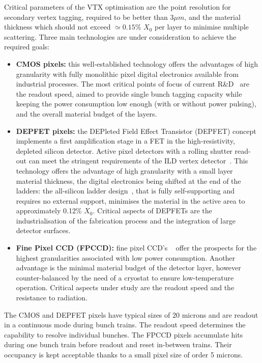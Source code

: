 Critical parameters of the VTX optimisation are the point resolution for secondary vertex tagging, required to be better than 3$\mu m$, and the material thickness which should not exceed $\simeq 0.15\%$ $X_0$ per layer to minimise multiple scattering. Three main technologies are under consideration to achieve the required goals:
\begin{itemize}
    \item {\bf CMOS pixels:} this well-established technology offers the advantages of high granularity with fully monolithic pixel digital electronics available from industrial processes. The most critical points of focus of current R\&D~\cite{Besson:2016ivb} are the readout speed, aimed to provide single bunch tagging capacity while keeping the power consumption low enough (with or without power pulsing), and the overall material budget of the layers.
    \item {\bf DEPFET pixels:} the DEPleted Field Effect Transistor (DEPFET) concept implements a first amplification stage in a FET in the high-resistivity, depleted silicon detector. Active pixel detectors with a rolling shutter read-out can meet the stringent requirements of the ILD vertex detector~\cite{Alonso:2012ss,Richter:2003dn}. This technology offers the advantage of high granularity with a small layer material thickness, the digital electronics being shifted at the end of the ladders: the all-silicon ladder design~\cite{Andricek:2004cj}, that is fully self-supporting and requires no external support, minimises the material in the active area to approximately 0.12\% $X_{0}$. Critical aspects of DEPFETs are the industrialisation of the fabrication process and the integration of large detector surfaces.
    \item{\bf Fine Pixel CCD (FPCCD):} fine pixel CCD's ~\cite{Paredes:2014kda} offer the prospects for the highest granularities associated with low power consumption. Another advantage is the minimal material budget of the detector layer, however counter-balanced by the need of a cryostat to ensure low-temperature operation. Critical aspects under study are the readout speed and the resistance to radiation.  
\end{itemize}

\vspace{0.5cm}
The CMOS and DEPFET pixels have typical sizes of 20 microns and are readout in a continuous mode during bunch trains. The readout speed determines the capability to resolve individual bunches. The FPCCD pixels accumulate hits during one bunch train before readout and reset in-between trains. Their occupancy is kept acceptable thanks to a small pixel size of order 5 microns.  

